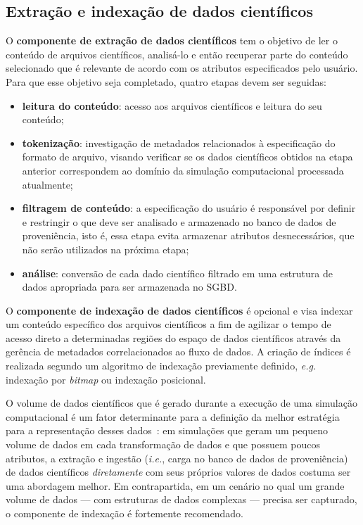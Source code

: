 \subsection{Extração e indexação de dados científicos}%
\label{subsec:extracao-e-indexacao-de-dados-cientificos}

O \textbf{componente de extração de dados científicos} tem o objetivo de ler o conteúdo de arquivos científicos, analisá-lo e então recuperar parte do conteúdo selecionado que é relevante de acordo com os atributos especificados pelo usuário. Para que esse objetivo seja completado, quatro etapas devem ser seguidas:

\begin{itemize}
    \item \textbf{leitura do conteúdo}: acesso aos arquivos científicos e leitura do seu conteúdo;
    \item \textbf{tokenização}: investigação de metadados relacionados à especificação do formato de arquivo, visando verificar se os dados científicos obtidos na etapa anterior correspondem ao domínio da simulação computacional processada atualmente;
    \item \textbf{filtragem de conteúdo}: a especificação do usuário é responsável por definir e restringir o que deve ser analisado e armazenado no banco de dados de proveniência, isto é, essa etapa evita armazenar atributos desnecessários, que não serão utilizados na próxima etapa;
    \item \textbf{análise}: conversão de cada dado científico filtrado em uma estrutura de dados apropriada para ser armazenada no SGBD.
\end{itemize}

O \textbf{componente de indexação de dados científicos} é opcional e visa indexar um conteúdo específico dos arquivos científicos a fim de agilizar o tempo de acesso direto a determinadas regiões do espaço de dados científicos através da gerência de metadados correlacionados ao fluxo de dados. A criação de índices é realizada segundo um algoritmo de indexação previamente definido, \textit{e.g.} indexação por \textit{bitmap} ou indexação posicional.

O volume de dados científicos que é gerado durante a execução de uma simulação computacional é um fator determinante para a definição da melhor estratégia para a representação desses dados~\cite{silva2015propostadoutorado}: em simulações que geram um pequeno volume de dados em cada transformação de dados e que possuem poucos atributos, a extração e ingestão (\textit{i.e.}, carga no banco de dados de proveniência) de dados científicos \emph{diretamente} com seus próprios valores de dados costuma ser uma abordagem melhor. Em contrapartida, em um cenário no qual um grande volume de dados --- com estruturas de dados complexas --- precisa ser capturado, o componente de indexação é fortemente recomendado.

